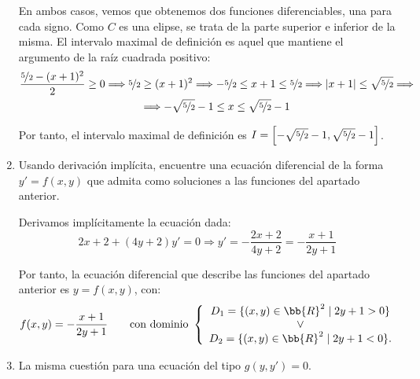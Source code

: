 \begin{ejercicio}
\begin{enumerate}
        En ambos casos, vemos que obtenemos dos funciones diferenciables, una para cada signo. Como $C$ es una elipse, se trata de la parte superior e inferior de la misma. El intervalo maximal de definición es aquel que mantiene el argumento de la raíz cuadrada positivo:
        \begin{multline*}
            \dfrac{\nicefrac{5}{2} - (x+1)^2}{2} \geq 0 \Longrightarrow \nicefrac{5}{2} \geq (x+1)^2 \Longrightarrow -\nicefrac{5}{2} \leq x+1 \leq \nicefrac{5}{2} \Longrightarrow |x+1|\leq \sqrt{\nicefrac{5}{2}}
            \Longrightarrow \\ \Longrightarrow
            -\sqrt{\nicefrac{5}{2}}-1 \leq x \leq \sqrt{\nicefrac{5}{2}}-1
        \end{multline*}

        Por tanto, el intervalo maximal de definición es $I=\left[-\sqrt{\nicefrac{5}{2}}-1, \sqrt{\nicefrac{5}{2}}-1\right]$.
        \item Usando derivación implícita, encuentre una ecuación diferencial de la forma \(y' = f(x, y)\) que admita como soluciones a las funciones del apartado anterior.
        
        Derivamos implícitamente la ecuación dada:
        \begin{equation*}
            2x +2+(4y+2)y' = 0 \Longrightarrow y' = -\dfrac{2x+2}{4y+2} = -\dfrac{x+1}{2y+1}
        \end{equation*}

        Por tanto, la ecuación diferencial que describe las funciones del apartado anterior es $y=f(x, y)$, con:
        \begin{equation*}
            f(x, y) = -\dfrac{x+1}{2y+1} \qquad \text{con dominio } \left\{\begin{array}{c}
                D_1=\{(x, y)\in \bb{R}^2 \mid 2y+1>0\}\\
                \lor \\
                D_2=\{(x, y)\in \bb{R}^2 \mid 2y+1<0\}.\\
            \end{array}\right.
        \end{equation*}
        \item La misma cuestión para una ecuación del tipo \(g(y, y') = 0\).
        
    \end{enumerate}
\end{ejercicio}


